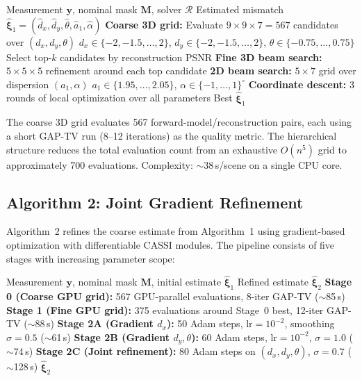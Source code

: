 \documentclass[runningheads]{llncs}
\begin{document}
\begin{algorithm}[t]
\caption{Hierarchical Beam Search (Coarse Calibration)}
\label{alg:beam}
\begin{algorithmic}[1]
\REQUIRE Measurement $\mathbf{y}$, nominal mask $\mathbf{M}$, solver $\mathcal{R}$
\ENSURE Estimated mismatch $\hat{\boldsymbol{\xi}}_1 = (\hat{d}_x, \hat{d}_y, \hat{\theta}, \hat{a}_1, \hat{\alpha})$
\STATE \textbf{Coarse 3D grid:} Evaluate $9 \times 9 \times 7 = 567$ candidates over $(d_x, d_y, \theta)$
\STATE \hspace{1em} $d_x \in \{-2, -1.5, \ldots, 2\}$, $d_y \in \{-2, -1.5, \ldots, 2\}$, $\theta \in \{-0.75, \ldots, 0.75\}$
\STATE Select top-$k$ candidates by reconstruction PSNR
\STATE \textbf{Fine 3D beam search:} $5 \times 5 \times 5$ refinement around each top candidate
\STATE \textbf{2D beam search:} $5 \times 7$ grid over dispersion $(a_1, \alpha)$
\STATE \hspace{1em} $a_1 \in \{1.95, \ldots, 2.05\}$, $\alpha \in \{-1, \ldots, 1\}^\circ$
\STATE \textbf{Coordinate descent:} 3 rounds of local optimization over all parameters
\RETURN Best $\hat{\boldsymbol{\xi}}_1$
\end{algorithmic}
\end{algorithm}

The coarse 3D grid evaluates 567 forward-model/reconstruction pairs, each using a short GAP-TV run (8--12 iterations) as the quality metric.
The hierarchical structure reduces the total evaluation count from an exhaustive $O(n^5)$ grid to approximately 700 evaluations.
Complexity: $\sim$38\,s/scene on a single CPU core.

\subsection{Algorithm 2: Joint Gradient Refinement}
\label{sec:alg2}

Algorithm~2 refines the coarse estimate from Algorithm~1 using gradient-based optimization with differentiable CASSI modules.
The pipeline consists of five stages with increasing parameter scope:

\begin{algorithm}[t]
\caption{Joint Gradient Refinement (Fine Calibration)}
\label{alg:gradient}
\begin{algorithmic}[1]
\REQUIRE Measurement $\mathbf{y}$, nominal mask $\mathbf{M}$, initial estimate $\hat{\boldsymbol{\xi}}_1$
\ENSURE Refined estimate $\hat{\boldsymbol{\xi}}_2$
\STATE \textbf{Stage 0 (Coarse GPU grid):} 567 GPU-parallel evaluations, 8-iter GAP-TV ($\sim$85\,s)
\STATE \textbf{Stage 1 (Fine GPU grid):} 375 evaluations around Stage~0 best, 12-iter GAP-TV ($\sim$88\,s)
\STATE \textbf{Stage 2A (Gradient $d_x$):} 50 Adam steps, $\text{lr}=10^{-2}$, smoothing $\sigma=0.5$ ($\sim$61\,s)
\STATE \textbf{Stage 2B (Gradient $d_y, \theta$):} 60 Adam steps, $\text{lr}=10^{-2}$, $\sigma=1.0$ ($\sim$74\,s)
\STATE \textbf{Stage 2C (Joint refinement):} 80 Adam steps on $(d_x, d_y, \theta)$, $\sigma=0.7$ ($\sim$128\,s)
\RETURN $\hat{\boldsymbol{\xi}}_2$
\end{algorithmic}
\end{algorithm}
\end{document}
